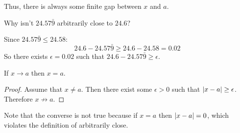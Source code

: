 \documentclass[letterpaper,12pt,fleqn]{article}
\newcommand{\e}{\epsilon}
\begin{document}
\bigskip

\begin{center}
\end{center}

Thus, there is always some finite gap between \(x\) and \(a\).

\begin{example}
  Why isn't \(24.57\bar{9}\) arbitrarily close to \(24.6\)?

  Since \(24.57\bar{9}\le24.58\):
  \[24.6-24.57\bar{9}\ge24.6-24.58=0.02\]
  So there exists \(\e=0.02\) such that \(24.6-24.57\bar{9}\ge\e\).
\end{example}

\begin{theorem}
  If \(x\to a\) then \(x=a\).
\end{theorem}

\begin{proof}
  Assume that \(x\ne a\).  Then there exist some \(\e>0\) such that \(\abs{x-a}\ge\e\).  Therefore \(x\not\to a\).
\end{proof}

Note that the converse is not true because if \(x=a\) then \(\lvert x-a\rvert=0\), which violates the definition of
arbitrarily close.
\end{document}
